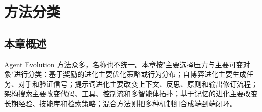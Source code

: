 
\section{方法分类}\label{ch:methods}

\subsection{本章概述}

Agent Evolution 方法众多，名称也不统一。本章按"主要选择压力与主要可变对象"进行分类：基于奖励的进化主要优化策略或行为分布；自博弈进化主要生成任务、对手和验证信号；提示词进化主要改变上下文、反思、原则和输出修订流程；架构搜索主要改变代码、工具、控制流和多智能体拓扑；基于记忆的进化主要改变长期经验、技能库和检索策略；混合方法则把多种机制组合成端到端闭环。

